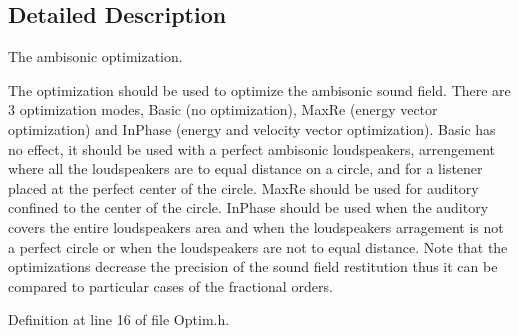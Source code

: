\subsection{Detailed Description}
The ambisonic optimization. 

The optimization should be used to optimize the ambisonic sound field. There are 3 optimization modes, Basic (no optimization), Max\-Re (energy vector optimization) and In\-Phase (energy and velocity vector optimization). Basic has no effect, it should be used with a perfect ambisonic loudspeakers, arrengement where all the loudspeakers are to equal distance on a circle, and for a listener placed at the perfect center of the circle. Max\-Re should be used for auditory confined to the center of the circle. In\-Phase should be used when the auditory covers the entire loudspeakers area and when the loudspeakers arragement is not a perfect circle or when the loudspeakers are not to equal distance. Note that the optimizations decrease the precision of the sound field restitution thus it can be compared to particular cases of the fractional orders. 

Definition at line 16 of file Optim.\-h.



